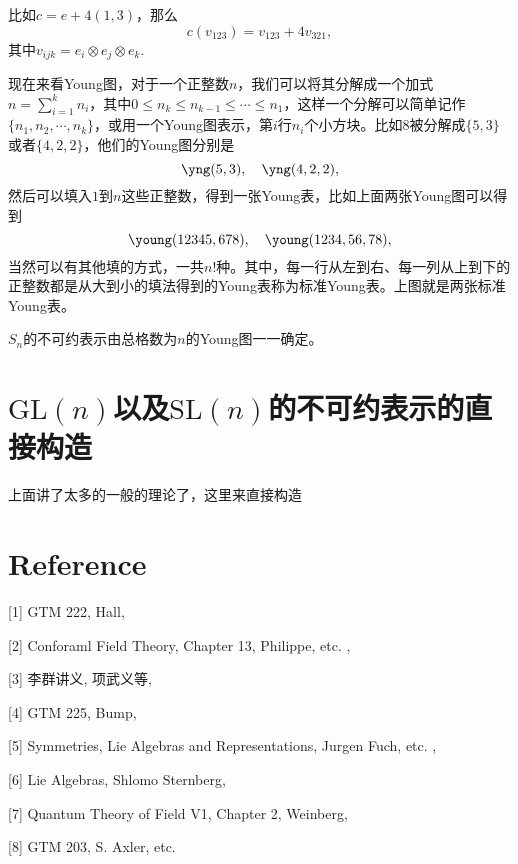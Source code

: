 \documentclass[9pt]{extarticle}
\begin{document}
比如$c=e+4(1,3)$，那么
\[
	c(v_{123})=v_{123}+4v_{321},
\]
其中$v_{ijk}=e_{i}\otimes e_{j}\otimes e_{k}$.

\para 现在来看Young图，对于一个正整数$n$，我们可以将其分解成一个加式$n=\sum_{i=1}^k n_i$，其中$0\leq n_k\leq n_{k-1}\leq \cdots \leq n_1$，这样一个分解可以简单记作$\{n_1,n_2,\cdots,n_k\}$，或用一个Young图表示，第$i$行$n_i$个小方块。比如$8$被分解成$\{5,3\}$或者$\{4,2,2\}$，他们的Young图分别是
\[
	\yng(5,3),\quad \yng(4,2,2),
\]
然后可以填入$1$到$n$这些正整数，得到一张Young表，比如上面两张Young图可以得到
\[
	\young(12345,678),\quad \young(1234,56,78),
\]
当然可以有其他填的方式，一共$n!$种。其中，每一行从左到右、每一列从上到下的正整数都是从大到小的填法得到的Young表称为标准Young表。上图就是两张标准Young表。

\theo $S_n$的不可约表示由总格数为$n$的Young图一一确定。


\section{$\mathrm{GL}(n)$以及$\mathrm{SL}(n)$的不可约表示的直接构造}
上面讲了太多的一般的理论了，这里来直接构造

\clearpage

\section*{Reference}

[1] GTM 222, Hall,

[2] Conforaml Field Theory, Chapter 13, Philippe, etc. ,

[3] 李群讲义, 项武义等, 

[4] GTM 225, Bump,

[5] Symmetries, Lie Algebras and Representations, Jurgen Fuch, etc. ,

[6] Lie Algebras, Shlomo Sternberg,

[7] Quantum Theory of Field V1, Chapter 2, Weinberg,

[8] GTM 203, S. Axler, etc.
\end{document}
